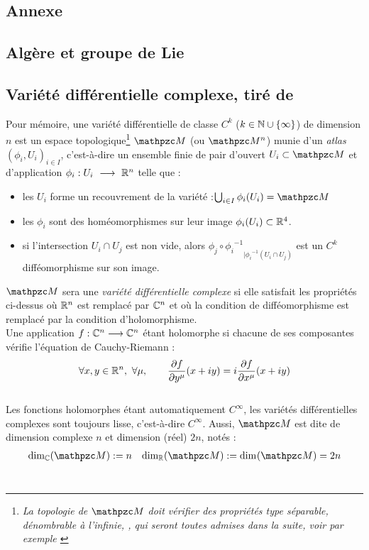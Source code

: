 \begin{annexe}

\section{Annexe}

\subsection{Algère et groupe de Lie} \label{ann:2Lie}




\subsection{Variété différentielle complexe, tiré de \cite{nakahara_geometry_2003}}

Pour mémoire, une variété différentielle de classe $C^k$ ($k\in\mathbb{N}\cup\{\infty\}$) de dimension $n$ est un espace topologique\footnote{\itshape
	La topologie de $\manu$ doit vérifier des propriétés type séparable, dénombrable à l'infinie, \etc, qui seront toutes admises dans la suite, voir par exemple \cite[chap. 2]{lafontaine_introduction_2015}}
$\manu$ (ou $\manu^n$) munie d'un \emph{atlas} $(\phi_i, U_i)_{i\in I}$, c'est-à-dire un ensemble finie de pair d'ouvert $U_i\subset \manu$ et d'application $\phi_i :U_i\ \longrightarrow\ \mathbb{R}^n$ telle que :
\begin{itemize}
	
	\item les $U_i$ forme un recouvrement de la variété :\qquad $\bigcup_{i\in I} \phi_i(U_i) = \manu$
	
	\item les $\phi_i$ sont des homéomorphismes sur leur image $\phi_i(U_i)\subset\mathbb{R}^4$.
	
	\item si l'intersection $U_i \cap U_j$ est non vide, alors ${\phi_j \circ {\phi_i}^{-1}}_{| {\phi_i}^{-1}(U_i\cap U_j)}$ est un $C^k$ difféomorphisme sur son image.
\end{itemize}

$\manu$ sera une \emph{variété différentielle complexe} si elle satisfait les propriétés ci-dessus où $\mathbb{R}^n$ est remplacé par $\mathbb{C}^n$ et où la condition de difféomorphisme est remplacé par la condition d'holomorphisme. 
\\
Une application $f : \mathbb{C}^n\longrightarrow \mathbb{C}^n$ étant holomorphe si chacune de ses composantes vérifie l'équation de Cauchy-Riemann :
\[\forall x,y\in\R^n,\ \forall \mu,\qquad \frac{\partial f }{\partial y^\mu}(x+iy) = i \frac{\partial f }{\partial x^\mu}(x+iy)\]
\\
Les fonctions holomorphes étant automatiquement $C^\infty$, les variétés différentielles complexes sont toujours lisse, c'est-à-dire $C^\infty$. Aussi, $\manu$ est dite de dimension complexe $n$ et dimension (réel) $2n$, notés :
\begin{align}\label{eq:manuC-base_cano}
	\dim[\C](\manu) &\defeq n  &  \dim[\R] (\manu) \defeq \dim (\manu) = 2n
\end{align}
\\


\end{annexe}
